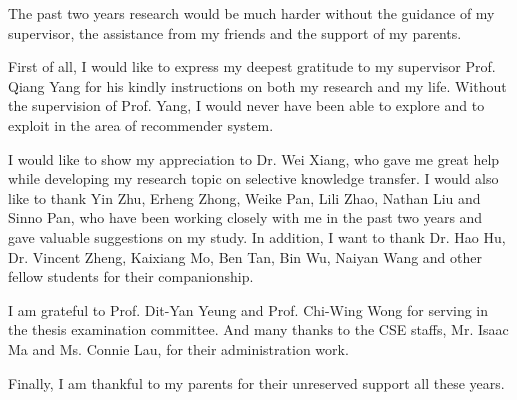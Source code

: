 The past two years research would be much harder without the guidance of my supervisor, the assistance from my friends and the support of my parents.

First of all, I would like to express my deepest gratitude to my supervisor Prof. Qiang Yang for his kindly instructions on both my research and my life. Without the supervision of Prof. Yang, I would never have been able to explore and to exploit in the area of recommender system.

I would like to show my appreciation to Dr. Wei Xiang, who gave me great help while developing my research topic on selective knowledge transfer. I would also like to thank Yin Zhu, Erheng Zhong, Weike Pan, Lili Zhao, Nathan Liu and Sinno Pan, who have been working closely with me in the past two years and gave valuable suggestions on my study. In addition, I want to thank Dr. Hao Hu, Dr. Vincent Zheng, Kaixiang Mo, Ben Tan, Bin Wu, Naiyan Wang and other fellow students for their companionship.

I am grateful to Prof. Dit-Yan Yeung and Prof. Chi-Wing Wong for serving in the thesis examination committee. And many thanks to the CSE staffs, Mr. Isaac Ma and Ms. Connie Lau, for their administration work.

Finally, I am thankful to my parents for their unreserved support all these years.

